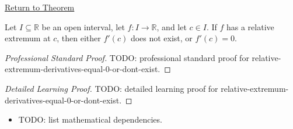 \newpage
{}
\label{prf:relative-extremum-derivatives-equal-0-or-dont-exist}

\begin{remark*}[Return]
\hyperref[cor:necessary-condition-extremum]{Return to Theorem}
\end{remark*}

\begin{corollary*}
Let $I \subseteq \mathbb{R}$ be an open interval, let $f : I \to \mathbb{R}$, and let $c \in I$. If $f$ has a relative extremum at $c$, then either $f'(c)$ does not exist, or $f'(c) = 0$.
\end{corollary*}

\begin{proof}[Professional Standard Proof]
\LRAProofBodyStart
TODO: professional standard proof for relative-extremum-derivatives-equal-0-or-dont-exist.
\end{proof}

\begin{proof}[Detailed Learning Proof]
\LRAProofBodyStart
TODO: detailed learning proof for relative-extremum-derivatives-equal-0-or-dont-exist.
\end{proof}

\begin{remark*}
\end{remark*}

\begin{dependencies}
\begin{itemize}
  \item TODO: list mathematical dependencies.
\end{itemize}
\end{dependencies}

\clearpage
